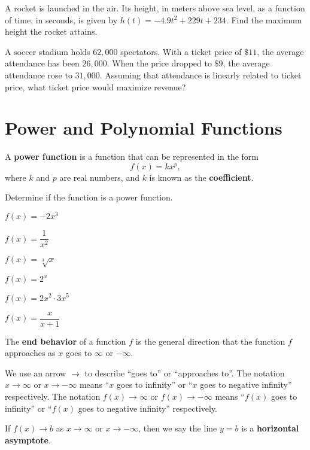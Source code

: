 \begin{exercise}
  A rocket is launched in the air. Its height, in meters above sea level, as a function of time, in seconds, is given by \(h(t)=-4.9t^2+229t+234\). Find the maximum height the rocket attains.
\end{exercise}

\begin{exercise}
  A soccer stadium holds \(62,000\) spectators. With a ticket price of \(\$11\), the average attendance has been \(26,000\). When the price dropped to \(\$9\), the average attendance rose to \(31,000\). Assuming that attendance is linearly related to ticket price, what ticket price would maximize revenue?
\end{exercise}

\newpage

\section{Power and Polynomial Functions}

\begin{definition}
  A \textbf{power function} is a function that can be represented in the form
\[f(x)=kx^p,\]
where \(k\) and \(p\) are real numbers, and \(k\) is known as the \textbf{coefficient}.
\end{definition}

\begin{example}
  Determine if the function is a power function.\\
  \begin{enumerate*}
    \item $f(x)=-2x^3$
    \item $f(x)=\dfrac{1}{x^2}$
    \item $f(x)=\sqrt[3]{x}$
    \item $f(x)=2^x$
    \item $f(x)=2x^2\cdot 3x^5$
    \item $f(x)=\dfrac{x}{x+1}$
  \end{enumerate*}
\end{example}

\begin{definition}
  The \textbf{end behavior} of a function $f$ is the general direction that the function $f$ approaches as $x$ goes to $\infty$ or $-\infty$. 
  
  We use an arrow $\to$ to describe ``goes to'' or ``approaches to''. 
  The notation $x\to \infty$ or $x\to -\infty$ means ``$x$ goes to infinity'' or ``$x$ goes to negative infinity'' respectively.
  The notation $f(x)\to \infty$ or $f(x)\to -\infty$ means ``$f(x)$ goes to infinity'' or ``$f(x)$ goes to negative infinity'' respectively.

  If $f(x)\to b$ as $x\to \infty$ or $x\to -\infty$, then we say the line $y=b$ is a \textbf{horizontal asymptote}.
\end{definition}

